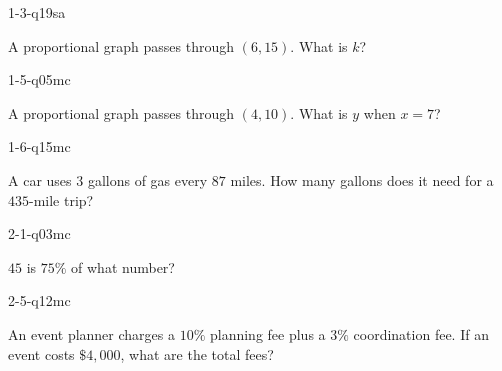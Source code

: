 
\begin{practiceQuestion}{1-3-q19}{sa}
\begin{questionText}
A proportional graph passes through $(6, 15)$. What is $k$?
\end{questionText}
\end{practiceQuestion}

\begin{practiceQuestion}{1-5-q05}{mc}
\begin{questionText}
A proportional graph passes through $(4, 10)$. What is $y$ when $x = 7$?
\end{questionText}
\end{practiceQuestion}

\begin{practiceQuestion}{1-6-q15}{mc}
\begin{questionText}
A car uses $3$ gallons of gas every $87$ miles. How many gallons does it need for a $435$-mile trip?
\end{questionText}
\end{practiceQuestion}

\begin{practiceQuestion}{2-1-q03}{mc}
\begin{questionText}
$45$ is $75\%$ of what number?
\end{questionText}
\end{practiceQuestion}

\begin{practiceQuestion}{2-5-q12}{mc}
\begin{questionText}
An event planner charges a $10\%$ planning fee plus a $3\%$ coordination fee. If an event costs $\$4{,}000$, what are the total fees?
\end{questionText}
\end{practiceQuestion}

